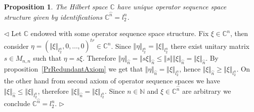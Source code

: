 \documentclass[12pt]{article}
\newtheorem{proposition}[theorem]{Proposition}
\newenvironment{proof}{\par $\triangleleft$}{$\triangleright$}
\begin{document}
\begin{proposition}\label{PrCHaveUniqueOSS} The Hilbert space $\mathbb{C}$ have
unique operator sequence space structure given by identifications
$\mathbb{C}^{\wideparen{n}}=l_2^n$.
\end{proposition}
\begin{proof} Let $\mathbb{C}$ endowed with some operator sequence space
structure. Fix $\xi\in\mathbb{C}^n$, then consider 
$\eta={(\Vert \xi\Vert_{l_2^n},0,\ldots,0)}^{tr}\in \mathbb{C}^n$. Since
$\Vert\eta\Vert_{l_2^n}=\Vert\xi\Vert_{l_2^n}$  there exist unitary matrix 
$s\in M_{n,n}$ such that $\eta=s\xi$. Therefore 
$\Vert\eta\Vert_{\wideparen{n}}
    =\Vert s\xi\Vert_{\wideparen{n}}
    \leq\Vert s\Vert\Vert\xi\Vert_{\wideparen{n}}
    =\Vert\xi\Vert_{\wideparen{n}}$. 
By proposition~\ref{PrRedundantAxiom} we get that
$\Vert\eta\Vert_{\wideparen{n}}=\Vert \xi\Vert_{l_2^n}$, hence
$\Vert\xi\Vert_{\wideparen{n}}\geq\Vert\xi\Vert_{l_2^n}$. On the other hand from
second axiom of operator sequence spaces we have $\Vert
\xi\Vert_{\wideparen{n}}\leq\Vert\xi\Vert_{l_2^n}$, therefore $\Vert
\xi\Vert_{\wideparen{n}}=\Vert \xi\Vert_{l_2^n}$. Since $n\in\mathbb{N}$ and
$\xi\in \mathbb{C}^{\wideparen{n}}$ are arbitrary we conclude
$\mathbb{C}^{\wideparen{n}}=l_2^n$.
\end{proof}
\end{document}
